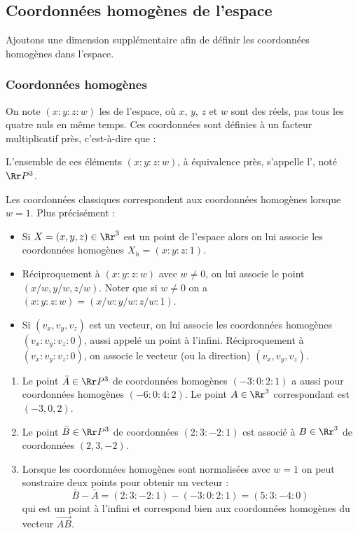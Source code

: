 \documentclass[11pt,class=report,crop=false]{standalone}
\begin{document}
\subsection{Coordonnées homogènes de l'espace}

Ajoutons une dimension supplémentaire afin de définir les coordonnées homogènes dans l'espace.

\subsubsection*{Coordonnées homogènes}

On note $(x:y:z:w)$ les  de l'espace, où $x$, $y$, $z$ et $w$ sont des réels, pas tous les quatre nuls en même temps.
Ces coordonnées sont définies à un facteur multiplicatif près, c'est-à-dire que :

L'ensemble de ces éléments $(x:y:z:w)$, à équivalence près, s'appelle l', noté $\Rr P^3$.


Les coordonnées classiques correspondent aux coordonnées homogènes lorsque $w=1$. Plus précisément :
\begin{itemize}
	\item Si $X = (x,y,z) \in \Rr^3$ est un point de l'espace alors on lui associe les coordonnées homogènes $X_h = (x:y:z:1)$.
	
	\item Réciproquement à $(x:y:z:w)$ avec $w\neq 0$, on lui associe le point $(x/w,y/w,z/w)$. Noter que si $w\neq 0$ on a $(x:y:z:w) = (x/w:y/w:z/w:1)$.
	
	\item Si $(v_x,v_y,v_z)$ est un vecteur, on lui associe les coordonnées homogènes $(v_x:v_y:v_z:0)$, aussi appelé \og{}un point à l'infini\fg{}.
	Réciproquement à $(v_x:v_y:v_z:0)$, on associe le vecteur (ou la direction) $(v_x,v_y,v_z)$.
\end{itemize}

\begin{exemple}
	\sauteligne
\begin{enumerate}
	\item Le point $\bar A \in \Rr P^3$ de coordonnées homogènes $(-3:0:2:1)$ a aussi pour coordonnées homogènes $(-6:0:4:2)$.
	Le point $A \in \Rr^3$ correspondant est $(-3,0,2)$.
	
	\item Le point $\bar B \in \Rr P^3$ de coordonnées $(2:3:-2:1)$ est associé à $B \in \Rr^3$ de coordonnées $(2,3,-2)$.
	
	\item Lorsque les coordonnées homogènes sont normalisées avec $w=1$ on peut soustraire deux points pour obtenir un vecteur :
	$$\bar B - \bar A =(2:3:-2:1) - (-3:0:2:1) = (5:3:-4:0)$$
	qui est un point à l'infini et correspond bien aux coordonnées homogènes du vecteur $\vec{AB}$.
	
\end{enumerate}	
\end{exemple}
\end{document}
